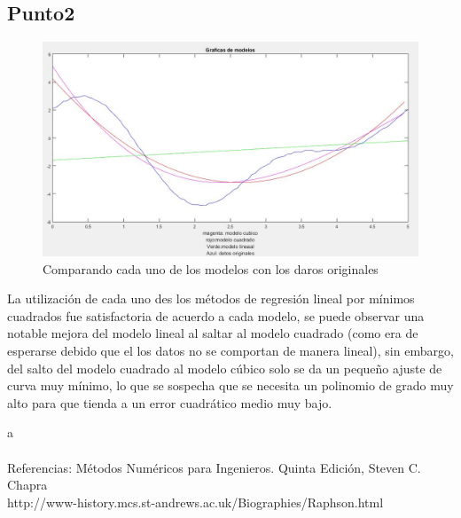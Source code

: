 \documentclass[12pt,letterpaper]{article}
\begin{document}
\subsection{Punto2}
\begin{figure}[hbtp]
\centering
\includegraphics[scale=.5]{imagenes/resolucion2.JPG}
\caption{Comparando cada uno de los modelos con los daros originales}
\end{figure}
La utilización de cada uno des los métodos de regresión lineal por mínimos cuadrados fue satisfactoria de acuerdo a cada modelo, se puede observar una notable mejora del modelo lineal al saltar al modelo cuadrado (como era de esperarse debido que el los datos no se comportan de manera lineal), sin embargo, del salto del modelo cuadrado al modelo cúbico solo se da un pequeño ajuste de curva muy mínimo, lo que se sospecha que se necesita un polinomio de grado muy alto para que tienda a un error cuadrático medio muy bajo.


a\\ \\
Referencias:
Métodos Numéricos para Ingenieros. Quinta Edición, Steven C. Chapra  \\
http://www-history.mcs.st-andrews.ac.uk/Biographies/Raphson.html
\end{document}
